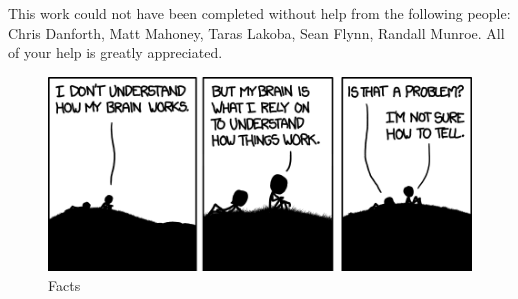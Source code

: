 This work could not have been completed without help from the following people: Chris Danforth, Matt Mahoney, Taras Lakoba, Sean Flynn, Randall Munroe.
All of your help is greatly appreciated.

\begin{figure}[ht]
  \centering
  \includegraphics{figure/xkcd}
  \caption{Facts}
  \label{fig:xkcd}
\end{figure}

